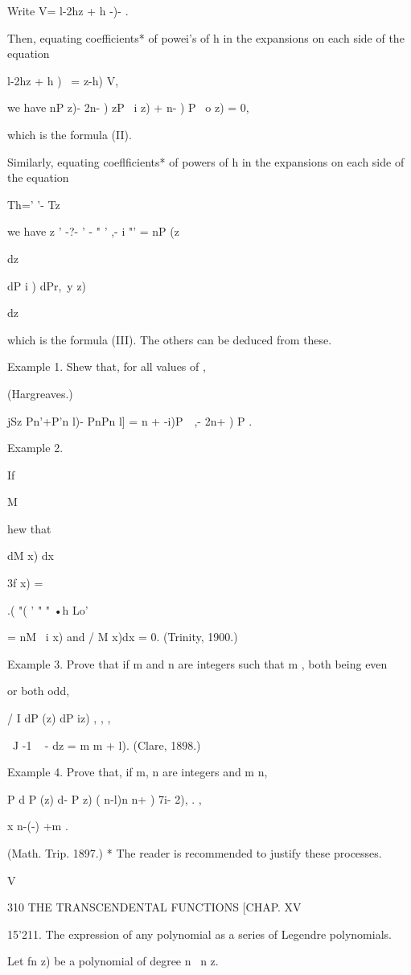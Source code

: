 {Write V= l-2hz + h -)- .

Then, equating coefficients* of powei's of h in the expansions on each
side of the equation

 l-2hz + h )~ = z-h) V,

we have nP z)- 2n- ) zP \ i z) + n- ) P \ o z) = 0,

which is the formula (II).

Similarly, equating coeflficients* of powers of h in the expansions on
each side of the equation

 Th=' '- Tz

we have z ' -?- ' - " ' ,- i "' = nP (z\

dz

dP i ) dPr,\ y z)

dz

which is the formula (III). The others can be deduced from these.

Example 1. Shew that, for all values of ,

(Hargreaves.)

jSz Pn'+P'n l)- PnPn l] = n + -i)P\ \ ,- 2n+ ) P .

Example 2.

If

M

hew that

dM x) dx

3f x) =

.( "( ' " " •h Lo'

= nM \ i x) and / M x)dx = 0. (Trinity, 1900.)

Example 3. Prove that if m and n are integers such that m , both being
even

or both odd,

/ I dP (z) dP iz) , , ,

\ J -1 ~ - dz = m m + l). (Clare, 1898.)

Example 4. Prove that, if m, n are integers and m n,

P d P (z) d- P z) ( n-l)n n+ ) 7i- 2), . ,

x n-(-) +m .

(Math. Trip. 1897.) * The reader is recommended to justify these
processes.

V

310 THE TRANSCENDENTAL FUNCTIONS [CHAP. XV

15'211. The expression of any polynomial as a series of Legendre
polynomials.

Let fn z) be a polynomial of degree n \ n z.

}
